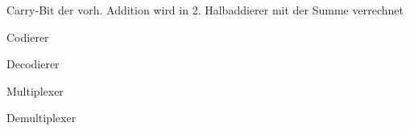 \documentclass
[
  draft    = true,
  fontsize = 11pt,
  parskip  = half-,
  BCOR     = 0pt,
  DIV      = 11,
  ngerman,
  dvipsnames
]
{scrartcl}
\begin{document}
\begin{mytemize}
\begin{mytemize}
\begin{karsten}
\begin{mytemize}
                    \item Carry-Bit der vorh. Addition wird in 2. Halbaddierer mit der Summe verrechnet
                  \end{mytemize}
                \end{karsten}
          \item Codierer
                \begin{achim}
                  \begin{mytemize}
                    \item 
                  \end{mytemize}
                \end{achim}
          \item Decodierer
                \begin{achim}
                  \begin{mytemize}
                    \item 
                  \end{mytemize}
                \end{achim}
          \item Multiplexer
                \begin{achim}
                  \begin{mytemize}
                    \item 
                  \end{mytemize}
                \end{achim}
          \item Demultiplexer
                \begin{achim}
                  \begin{mytemize}
                    \item 
                  \end{mytemize}
                \end{achim}
        \end{mytemize}
\end{mytemize}

\end{document}
